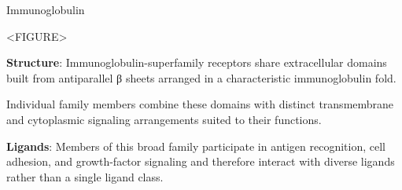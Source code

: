     \begin{core}{Immunoglobulin}

      <FIGURE>

      \textbf{Structure}: Immunoglobulin-superfamily receptors share extracellular domains built from antiparallel β sheets arranged in a characteristic immunoglobulin fold.

      Individual family members combine these domains with distinct transmembrane and cytoplasmic signaling arrangements suited to their functions.

      \textbf{Ligands}: Members of this broad family participate in antigen recognition, cell adhesion, and growth-factor signaling and therefore interact with diverse ligands rather than a single ligand class.

    \end{core}

